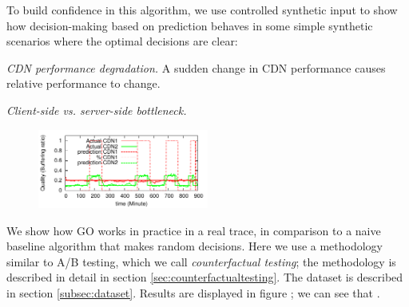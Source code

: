

To build confidence in this algorithm, we use controlled synthetic input to show how decision-making based on prediction behaves in some simple synthetic scenarios where the optimal decisions are clear:
\begin{packedenumerate}
  \item {\it CDN performance degradation.} A sudden change in CDN performance causes relative performance to change.
  \item {\it Client-side vs. server-side bottleneck.} 
\end{packedenumerate}

\begin{figure}[h!]
\centering
 \includegraphics[width=0.5\textwidth] {figures/behavior-evaluation/simple-change.pdf}
\label{fig:cdn-degradation}
\end{figure}

We show how GO works in practice in a real trace, in comparison to a naive baseline algorithm that makes random decisions.  Here we use a methodology similar to A/B testing, which we call {\it counterfactual testing}; the methodology is described in detail in section \ref{sec:counterfactualtesting}.  The dataset is described in section \ref{subsec:dataset}.  Results are displayed in figure \fillme; we can see that \fillme.

